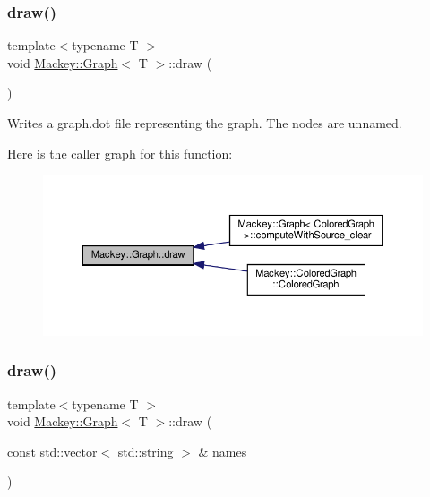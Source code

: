\subsubsection{\texorpdfstring{draw()}{draw()}\hspace{0.1cm}{\footnotesize\ttfamily [1/2]}}
{\footnotesize\ttfamily template$<$typename T $>$ \\
void \hyperlink{classMackey_1_1Graph}{Mackey\+::\+Graph}$<$ T $>$\+::draw (\begin{DoxyParamCaption}{ }\end{DoxyParamCaption})}



Writes a graph.\+dot file representing the graph. The nodes are unnamed. 

Here is the caller graph for this function\+:\nopagebreak
\begin{figure}[H]
\begin{center}
\leavevmode
\includegraphics[width=350pt]{classMackey_1_1Graph_ab88d38f2fa1822d415ce7dac272b32dc_icgraph}
\end{center}
\end{figure}
\mbox{\label{classMackey_1_1Graph_a63aa485ca7838f3dc66da1749e09cd84}} 
\subsubsection{\texorpdfstring{draw()}{draw()}\hspace{0.1cm}{\footnotesize\ttfamily [2/2]}}
{\footnotesize\ttfamily template$<$typename T $>$ \\
void \hyperlink{classMackey_1_1Graph}{Mackey\+::\+Graph}$<$ T $>$\+::draw (\begin{DoxyParamCaption}\item[{const std\+::vector$<$ std\+::string $>$ \&}]{names }\end{DoxyParamCaption})}




